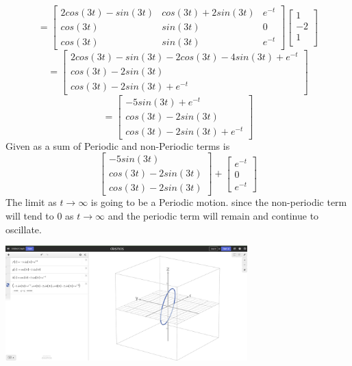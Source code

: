 \documentclass{article}
\begin{document}
$$ = \begin{bmatrix}
    2cos(3t) - sin(3t) & cos(3t)+2sin(3t) & e^{-t}\\
    cos(3t) & sin(3t) & 0\\
    cos(3t) & sin(3t) & e^{-t}
\end{bmatrix} \begin{bmatrix}
    1\\
    -2\\
    1\\
\end{bmatrix}$$
$$= \begin{bmatrix}
    2cos(3t) - sin(3t) - 2cos(3t) -4sin(3t) + e^{-t}\\
    cos(3t) - 2sin(3t)\\
    cos(3t) - 2sin(3t) + e^{-t}
\end{bmatrix}$$
$$= \begin{bmatrix}
    -5sin(3t) + e^{-t}\\
    cos(3t) - 2sin(3t)\\
    cos(3t) - 2sin(3t) + e^{-t}
\end{bmatrix}$$
Given as a sum of Periodic and non-Periodic terms is
$$\begin{bmatrix}
    -5sin(3t)\\
    cos(3t) - 2sin(3t)\\
    cos(3t) - 2sin(3t)
\end{bmatrix} + \begin{bmatrix}
    e^{-t}\\
    0\\
    e^{-t}
\end{bmatrix}$$
The limit as $t \to \infty$ is going to be a Periodic motion. since the non-periodic term will tend to 0 as $t \to \infty$ and the periodic term will remain and continue to oscillate.\\


\begin{center}
    \includegraphics[width=0.7\textwidth]{Workshop_7.png}
\end{center}
\end{document}
